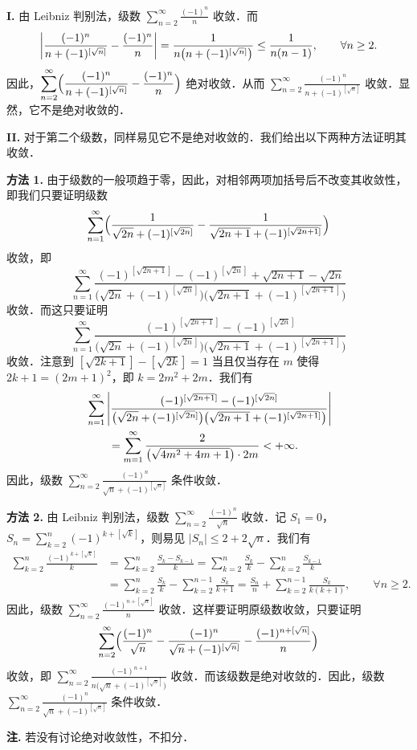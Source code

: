 \begin{solution}
\textbf{I.} 由 Leibniz 判别法，级数 $\displaystyle\sum_{n=2}^{\infty}\frac{(-1)^n}{n}$ 收敛．而
\[
  \left|\frac{(-1)^n}{n+(-1)^{[\sqrt{n}]}}-\frac{(-1)^n}{n}\right|
  =\frac{1}{n\bigl(n+(-1)^{[\sqrt{n}]}\bigr)}\le \frac{1}{n(n-1)},\qquad \forall n\ge 2.
\]
因此，$\displaystyle\sum_{n=2}^{\infty}\Bigl(\frac{(-1)^n}{n+(-1)^{[\sqrt{n}]}}-\frac{(-1)^n}{n}\Bigr)$ 绝对收敛．从而 $\displaystyle\sum_{n=2}^{\infty}\frac{(-1)^n}{n+(-1)^{[\sqrt{n}]}}$ 收敛．显然，它不是绝对收敛的．

\textbf{II.} 对于第二个级数，同样易见它不是绝对收敛的．我们给出以下两种方法证明其收敛．

\textbf{方法 1.} 由于级数的一般项趋于零，因此，对相邻两项加括号后不改变其收敛性，即我们只要证明级数
\[
  \sum_{n=1}^{\infty}\Bigl(\frac{1}{\sqrt{2n}+(-1)^{[\sqrt{2n}]}}
  -\frac{1}{\sqrt{2n+1}+(-1)^{[\sqrt{2n+1}]}}\Bigr)
\]
收敛，即
\[
  \sum_{n=1}^{\infty}
  \frac{(-1)^{[\sqrt{2n+1}]}-(-1)^{[\sqrt{2n}]}+\sqrt{2n+1}-\sqrt{2n}}
  {\bigl(\sqrt{2n}+(-1)^{[\sqrt{2n}]}\bigr)\bigl(\sqrt{2n+1}+(-1)^{[\sqrt{2n+1}]}\bigr)}
\]
收敛．而这只要证明
\[
  \sum_{n=1}^{\infty}
  \frac{(-1)^{[\sqrt{2n+1}]}-(-1)^{[\sqrt{2n}]}}
  {\bigl(\sqrt{2n}+(-1)^{[\sqrt{2n}]}\bigr)\bigl(\sqrt{2n+1}+(-1)^{[\sqrt{2n+1}]}\bigr)}
\]
收敛．注意到 $[\sqrt{2k+1}]-[\sqrt{2k}]=1$ 当且仅当存在 $m$ 使得 $2k+1=(2m+1)^2$，即 $k=2m^2+2m$．我们有
\begin{align*}
  &\sum_{n=1}^{\infty}\left|\frac{(-1)^{[\sqrt{2n+1}]}-(-1)^{[\sqrt{2n}]}}
  {\bigl(\sqrt{2n}+(-1)^{[\sqrt{2n}]}\bigr)\bigl(\sqrt{2n+1}+(-1)^{[\sqrt{2n+1}]}\bigr)}\right|\\
  &\qquad=\sum_{m=1}^{\infty}\frac{2}{\bigl(\sqrt{4m^2+4m+1}\bigr)\cdot 2m}<+\infty.
\end{align*}
因此，级数 $\displaystyle\sum_{n=2}^{\infty}\frac{(-1)^n}{\sqrt{n}+(-1)^{[\sqrt{n}]}}$ 条件收敛．

\textbf{方法 2.} 由 Leibniz 判别法，级数 $\displaystyle\sum_{n=2}^{\infty}\frac{(-1)^n}{\sqrt{n}}$ 收敛．记 $S_1=0$，$S_n=\displaystyle\sum_{k=2}^{n}(-1)^{k+[\sqrt{k}]}$，则易见 $|S_n|\le 2+2\sqrt{n}$．我们有
\begin{align*}
  \sum_{k=2}^{n}\frac{(-1)^{k+[\sqrt{k}]}}{k}
  &=\sum_{k=2}^{n}\frac{S_k-S_{k-1}}{k}
   =\sum_{k=2}^{n}\frac{S_k}{k}-\sum_{k=2}^{n}\frac{S_{k-1}}{k}\\
  &=\sum_{k=2}^{n}\frac{S_k}{k}-\sum_{k=2}^{n-1}\frac{S_k}{k+1}
   =\frac{S_n}{n}+\sum_{k=2}^{n-1}\frac{S_k}{k(k+1)},\qquad \forall n\ge 2.
\end{align*}
因此，级数 $\displaystyle\sum_{n=2}^{\infty}\frac{(-1)^{n+[\sqrt{n}]}}{n}$ 收敛．这样要证明原级数收敛，只要证明
\[
  \sum_{n=2}^{\infty}\Bigl(\frac{(-1)^n}{\sqrt{n}}
  -\frac{(-1)^n}{\sqrt{n}+(-1)^{[\sqrt{n}]}}
  -\frac{(-1)^{n+[\sqrt{n}]}}{n}\Bigr)
\]
收敛，即 $\displaystyle\sum_{n=2}^{\infty}\frac{(-1)^{n+1}}{n\bigl(\sqrt{n}+(-1)^{[\sqrt{n}]}\bigr)}$ 收敛．而该级数是绝对收敛的．因此，级数 $\displaystyle\sum_{n=2}^{\infty}\frac{(-1)^n}{\sqrt{n}+(-1)^{[\sqrt{n}]}}$ 条件收敛．

\textbf{注.} 若没有讨论绝对收敛性，不扣分．
\end{solution}

